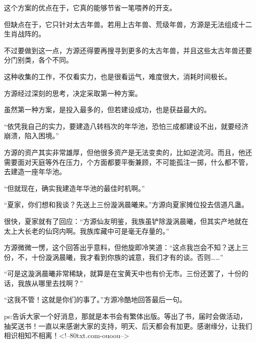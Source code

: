 \begin{this_body}
这个方案的优点在于，它真的能够节省一笔喂养的开支。

但缺点在于，它只针对太古年兽。若用上古年兽、荒级年兽，方源是无法组成十二生肖战阵的。

不过要做到这一点，方源还得要再搜寻到更多的太古年兽，并且这些太古年兽还要分门别类，各个不同。

这种收集的工作，不仅看实力，也是很看运气，难度很大，消耗时间极长。

方源经过深刻的思考，决定采取第一种方案。

虽然第一种方案，是投入最多的，但若建设成功，也是获益最大的。

“依凭我自己的实力，要建造八转档次的年华池，恐怕三成都建设不出，就要经济崩溃，陷入困境。”

方源的资产其实非常雄厚，但他很多资产是无法变卖的，比如逆流河。而且，他还需要面对天庭等外在压力，个方面都要平衡兼顾，不可能孤注一掷，什么都不管，去建造一座年华池。

“但就现在，确实我建造年华池的最佳时机啊。”

“夏家，你们想和我谈？先送上三份漩涡晨曦来。”方源向夏家摊位投去信道凡蛊。

很快，夏家就有了回应：“方源仙友明鉴，我族虽铲除漩涡晨曦，但其实产地就在太上大长老的仙窍内啊。我族库藏中可是毫无存量的。”

方源微微一愣，这个回答出乎意料，但他旋即冷笑道：“这点我岂会不知？送上三份，不，十份漩涡晨曦，我才看到你族的诚意，我们才有的谈。否则……”

“可是这漩涡晨曦非常稀缺，就算是在宝黄天中也有价无市。三份还罢了，十份的话，我族从哪里去找啊？”

“这我不管！这就是你们的事了。”方源冷酷地回答最后一句。

ps:告诉大家一个好消息，那就是本书会有繁体出版。等出了书，届时会做活动，抽奖送书！一直以来感谢大家的支持，明天、后天都会有加更。感谢缘分，让我们相识相知不相离！<!--80txt.com-ouoou-->

\end{this_body}

